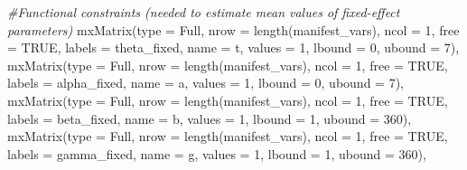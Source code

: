 \documentclass[
12pt, %
twoside,
english]{guelphthesis}
\newenvironment{Shaded}{\begin{snugshade}}{\end{snugshade}}
\newcommand{\AttributeTok}[1]{\textcolor[rgb]{0.77,0.63,0.00}{#1}}
\newcommand{\CommentTok}[1]{\textcolor[rgb]{0.56,0.35,0.01}{\textit{#1}}}
\newcommand{\ConstantTok}[1]{\textcolor[rgb]{0.00,0.00,0.00}{#1}}
\newcommand{\DecValTok}[1]{\textcolor[rgb]{0.00,0.00,0.81}{#1}}
\newcommand{\FunctionTok}[1]{\textcolor[rgb]{0.00,0.00,0.00}{#1}}
\newcommand{\NormalTok}[1]{#1}
\newcommand{\StringTok}[1]{\textcolor[rgb]{0.31,0.60,0.02}{#1}}
\begin{document}
\begin{Shaded}
\begin{Highlighting}[numbers=left,,]
  \CommentTok{\#Functional constraints (needed to estimate mean values of fixed{-}effect parameters)}
  \FunctionTok{mxMatrix}\NormalTok{(}\AttributeTok{type =} \StringTok{\textquotesingle{}Full\textquotesingle{}}\NormalTok{, }\AttributeTok{nrow =} \FunctionTok{length}\NormalTok{(manifest\_vars), }\AttributeTok{ncol =} \DecValTok{1}\NormalTok{, }\AttributeTok{free =} \ConstantTok{TRUE}\NormalTok{, }
           \AttributeTok{labels =} \StringTok{\textquotesingle{}theta\_fixed\textquotesingle{}}\NormalTok{, }\AttributeTok{name =} \StringTok{\textquotesingle{}t\textquotesingle{}}\NormalTok{, }\AttributeTok{values =} \DecValTok{1}\NormalTok{, }\AttributeTok{lbound =} \DecValTok{0}\NormalTok{,  }\AttributeTok{ubound =} \DecValTok{7}\NormalTok{), }
  \FunctionTok{mxMatrix}\NormalTok{(}\AttributeTok{type =} \StringTok{\textquotesingle{}Full\textquotesingle{}}\NormalTok{, }\AttributeTok{nrow =} \FunctionTok{length}\NormalTok{(manifest\_vars), }\AttributeTok{ncol =} \DecValTok{1}\NormalTok{, }\AttributeTok{free =} \ConstantTok{TRUE}\NormalTok{, }
           \AttributeTok{labels =} \StringTok{\textquotesingle{}alpha\_fixed\textquotesingle{}}\NormalTok{, }\AttributeTok{name =} \StringTok{\textquotesingle{}a\textquotesingle{}}\NormalTok{, }\AttributeTok{values =} \DecValTok{1}\NormalTok{, }\AttributeTok{lbound =} \DecValTok{0}\NormalTok{,  }\AttributeTok{ubound =} \DecValTok{7}\NormalTok{), }
  \FunctionTok{mxMatrix}\NormalTok{(}\AttributeTok{type =} \StringTok{\textquotesingle{}Full\textquotesingle{}}\NormalTok{, }\AttributeTok{nrow =} \FunctionTok{length}\NormalTok{(manifest\_vars), }\AttributeTok{ncol =} \DecValTok{1}\NormalTok{, }\AttributeTok{free =} \ConstantTok{TRUE}\NormalTok{, }
           \AttributeTok{labels =} \StringTok{\textquotesingle{}beta\_fixed\textquotesingle{}}\NormalTok{, }\AttributeTok{name =} \StringTok{\textquotesingle{}b\textquotesingle{}}\NormalTok{, }\AttributeTok{values =} \DecValTok{1}\NormalTok{, }\AttributeTok{lbound =} \DecValTok{1}\NormalTok{, }\AttributeTok{ubound =} \DecValTok{360}\NormalTok{),}
  \FunctionTok{mxMatrix}\NormalTok{(}\AttributeTok{type =} \StringTok{\textquotesingle{}Full\textquotesingle{}}\NormalTok{, }\AttributeTok{nrow =} \FunctionTok{length}\NormalTok{(manifest\_vars), }\AttributeTok{ncol =} \DecValTok{1}\NormalTok{, }\AttributeTok{free =} \ConstantTok{TRUE}\NormalTok{, }
           \AttributeTok{labels =} \StringTok{\textquotesingle{}gamma\_fixed\textquotesingle{}}\NormalTok{, }\AttributeTok{name =} \StringTok{\textquotesingle{}g\textquotesingle{}}\NormalTok{, }\AttributeTok{values =} \DecValTok{1}\NormalTok{, }\AttributeTok{lbound =} \DecValTok{1}\NormalTok{, }\AttributeTok{ubound =} \DecValTok{360}\NormalTok{), }


\end{Highlighting}
\end{Shaded}
\end{document}
